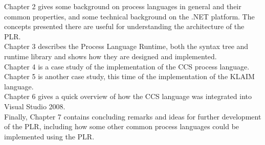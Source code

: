 	Chapter 2 gives some background on process languages in general and their 
	common properties, and some technical background on the .NET platform. The 
	concepts presented there are useful for understanding the architecture of 
	the PLR.\\
	Chapter 3 describes the Process Language Runtime, both the syntax tree and 
	runtime library and shows how they are designed and implemented. \\
	Chapter 4 is a case study of the implementation of the CCS process 
	language.\\
	Chapter 5 is another case study, this time of the implementation of the 
	KLAIM language.\\
	Chapter 6 gives a quick overview of how the CCS language was integrated into 
	Visual Studio 2008. \\
	Finally, Chapter 7 contains concluding remarks and ideas for further 
	development of the PLR, including how some other common process languages 	
	could be implemented using the PLR.\\

